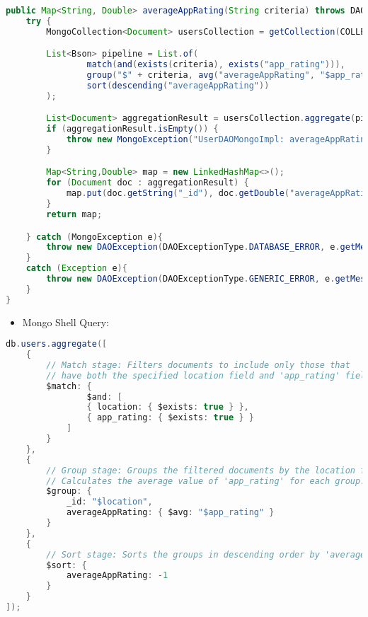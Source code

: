 \begin{mdframed}[style=customstyle]
\begin{lstlisting}[language=java]
    public Map<String, Double> averageAppRating(String criteria) throws DAOException {
    try {
        MongoCollection<Document> usersCollection = getCollection(COLLECTION_NAME);

        List<Bson> pipeline = List.of(
                match(and(exists(criteria), exists("app_rating"))),
                group("$" + criteria, avg("averageAppRating", "$app_rating")),
                sort(descending("averageAppRating"))
        );

        List<Document> aggregationResult = usersCollection.aggregate(pipeline).into(new ArrayList<>());
        if (aggregationResult.isEmpty()) {
            throw new MongoException("UserDAOMongoImpl: averageAppRating: No data found");
        }

        Map<String,Double> map = new LinkedHashMap<>();
        for (Document doc : aggregationResult) {
            map.put(doc.getString("_id"), doc.getDouble("averageAppRating"));
        }
        return map;

    } catch (MongoException e){
        throw new DAOException(DAOExceptionType.DATABASE_ERROR, e.getMessage());
    }
    catch (Exception e){
        throw new DAOException(DAOExceptionType.GENERIC_ERROR, e.getMessage());
    }
}\end{lstlisting}
\end{mdframed}
        
    \begin{itemize}
        \item Mongo Shell Query:
    \end{itemize}

\begin{mdframed}[style=customstyle2]
\begin{lstlisting}[language=java, backgroundcolor=\color{white}]
db.users.aggregate([
    { 
        // Match stage: Filters documents to include only those that 
        // have both the specified location field and 'app_rating' field.
        $match: { 
                $and: [
                { location: { $exists: true } },
                { app_rating: { $exists: true } }
            ]
        } 
    },
    { 
        // Group stage: Groups the filtered documents by the location field.
        // Calculates the average value of 'app_rating' for each group.
        $group: { 
            _id: "$location",
            averageAppRating: { $avg: "$app_rating" }
        } 
    },
    { 
        // Sort stage: Sorts the groups in descending order by 'averageAppRating'.
        $sort: { 
            averageAppRating: -1 
        } 
    }
]);\end{lstlisting}
\end{mdframed}

